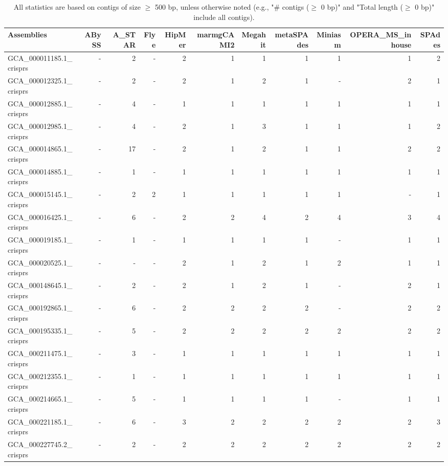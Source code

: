 \documentclass[12pt,a4paper]{article}
\begin{document}
\begin{table}[ht]
\begin{center}
\caption{All statistics are based on contigs of size $\geq$ 500 bp, unless otherwise noted (e.g., "\# contigs ($\geq$ 0 bp)" and "Total length ($\geq$ 0 bp)" include all contigs).}
\begin{tabular}{|l*{10}{|r}|}
\hline
Assemblies & ABySS & A\_STAR & Flye & HipMer & marmgCAMI2 & Megahit & metaSPAdes & Miniasm & OPERA\_MS\_inhouse & SPAdes \\ \hline
GCA\_000011185.1\_crisprs & - & 2 & - & 2 & 1 & 1 & 1 & 1 & 1 & 2 \\ \hline
GCA\_000012325.1\_crisprs & - & 2 & - & 2 & 1 & 2 & 1 & - & 2 & 1 \\ \hline
GCA\_000012885.1\_crisprs & - & 4 & - & 1 & 1 & 1 & 1 & 1 & 1 & 1 \\ \hline
GCA\_000012985.1\_crisprs & - & 4 & - & 2 & 1 & 3 & 1 & 1 & 1 & 2 \\ \hline
GCA\_000014865.1\_crisprs & - & 17 & - & 2 & 1 & 2 & 1 & 1 & 2 & 2 \\ \hline
GCA\_000014885.1\_crisprs & - & 1 & - & 1 & 1 & 1 & 1 & 1 & 1 & 1 \\ \hline
GCA\_000015145.1\_crisprs & - & 2 & 2 & 1 & 1 & 1 & 1 & 1 & - & 1 \\ \hline
GCA\_000016425.1\_crisprs & - & 6 & - & 2 & 2 & 4 & 2 & 4 & 3 & 4 \\ \hline
GCA\_000019185.1\_crisprs & - & 1 & - & 1 & 1 & 1 & 1 & - & 1 & 1 \\ \hline
GCA\_000020525.1\_crisprs & - & - & - & 2 & 1 & 2 & 1 & 2 & 1 & 1 \\ \hline
GCA\_000148645.1\_crisprs & - & 2 & - & 2 & 1 & 2 & 1 & - & 2 & 1 \\ \hline
GCA\_000192865.1\_crisprs & - & 6 & - & 2 & 2 & 2 & 2 & - & 2 & 2 \\ \hline
GCA\_000195335.1\_crisprs & - & 5 & - & 2 & 2 & 2 & 2 & 2 & 2 & 2 \\ \hline
GCA\_000211475.1\_crisprs & - & 3 & - & 1 & 1 & 1 & 1 & 1 & 1 & 1 \\ \hline
GCA\_000212355.1\_crisprs & - & 1 & - & 1 & 1 & 1 & 1 & 1 & 1 & 1 \\ \hline
GCA\_000214665.1\_crisprs & - & 5 & - & 1 & 1 & 1 & 1 & - & 1 & 1 \\ \hline
GCA\_000221185.1\_crisprs & - & 6 & - & 3 & 2 & 2 & 2 & 2 & 2 & 3 \\ \hline
GCA\_000227745.2\_crisprs & - & 2 & - & 2 & 2 & 2 & 2 & 2 & 2 & 2 \\ \hline

\end{tabular}
\end{center}
\end{table}
\end{document}
